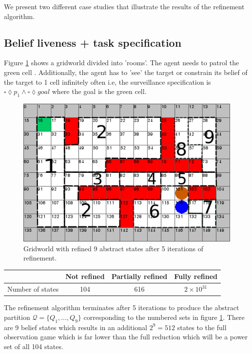 We present two different case studies that illustrate the results of the refinement algorithm. 

\subsection{Belief liveness + task specification}
Figure \ref{fig:case1} shows a gridworld divided into 'rooms'. The agent needs to patrol the green cell . Additionally, the agent has to 'see' the target or constrain its belief of the target to 1 cell infinitely often i.e, the surveillance specification is $\square \lozenge p_1 \wedge \square \lozenge goal$ where the goal is the green cell. 

\begin{figure}
\centering
\includegraphics[scale=0.4]{text970.png}\caption{Gridworld with refined 9 abstract states after 5 iterations of refinement.}\label{fig:case1}
\end{figure}

\begin{table}[h!]
\begin{tabular}{c|c|c|c}
& Not refined & Partially refined & Fully refined \\ \hline \hline
Number of states & 104 & 616 & $2\times10^{31}$
\end{tabular}
\end{table}
The refinement algorithm terminates after 5 iterations to produce the abstract partition $\mathcal{Q} = \{Q_1,...,Q_9 \}$ corresponding to the numbered sets in figure \ref{fig:case1}. There are 9 belief states which results in an additional $2^9 = 512$ states to the full observation game which is far lower than the full reduction which will be a power set of all 104 states.

